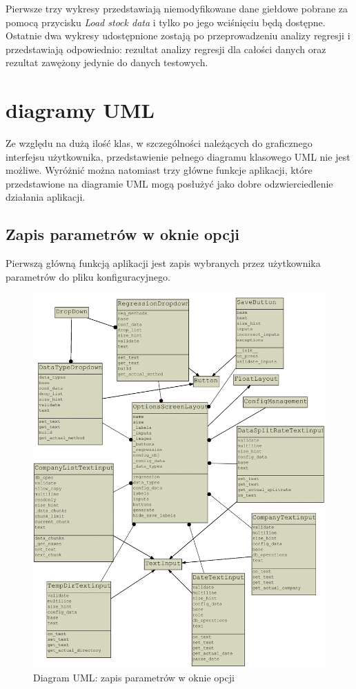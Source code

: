 Pierwsze trzy wykresy przedstawiają niemodyfikowane dane giełdowe pobrane za pomocą przycisku \textit{Load stock data} i tylko po jego wciśnięciu będą dostępne.
Ostatnie dwa wykresy udostępnione zostają po przeprowadzeniu analizy regresji i przedstawiają odpowiednio: rezultat analizy regresji dla całości danych oraz rezultat zawężony jedynie do danych testowych.

\section{diagramy UML}
Ze względu na dużą ilość klas, w szczególności należących do graficznego interfejsu użytkownika, przedstawienie pełnego diagramu klasowego UML nie jest możliwe.
Wyróżnić można natomiast trzy główne funkcje aplikacji, które przedstawione na diagramie UML mogą posłużyć jako dobre odzwierciedlenie działania aplikacji.

\subsection{Zapis parametrów w oknie opcji}
Pierwszą główną funkcją aplikacji jest zapis wybranych przez użytkownika parametrów do pliku konfiguracyjnego.\\
\begin{figure}[ht]
\centering
\includegraphics[scale=0.3]{pictures/uml_save.png}
\caption{Diagram UML: zapis parametrów w oknie opcji}
\label{fig:uml_zapis}
\end{figure}

